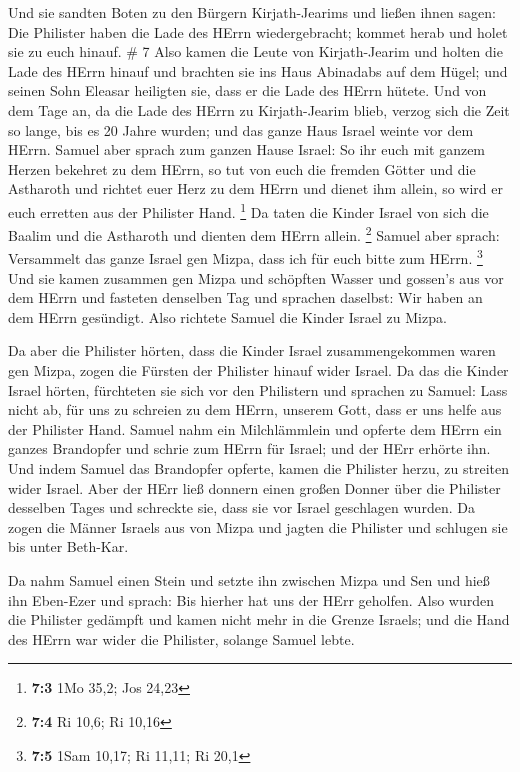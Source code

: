  Und sie sandten Boten zu den Bürgern Kirjath-Jearims und
ließen ihnen sagen: Die Philister haben die Lade des HErrn
wiedergebracht; kommet herab und holet sie zu euch hinauf. \# 7
 Also kamen die Leute von Kirjath-Jearim und holten die Lade
des HErrn hinauf und brachten sie ins Haus Abinadabs auf dem Hügel; und
seinen Sohn Eleasar heiligten sie, dass er die Lade des HErrn hütete.
 Und von dem Tage an, da die Lade des HErrn zu
Kirjath-Jearim blieb, verzog sich die Zeit so lange, bis es 20 Jahre
wurden; und das ganze Haus Israel weinte vor dem HErrn. 
Samuel aber sprach zum ganzen Hause Israel: So ihr euch mit ganzem
Herzen bekehret zu dem HErrn, so tut von euch die fremden Götter und die
Astharoth und richtet euer Herz zu dem HErrn und dienet ihm allein, so
wird er euch erretten aus der Philister Hand. \footnote{\textbf{7:3} 1Mo
  35,2; Jos 24,23}  Da taten die Kinder Israel von sich die
Baalim und die Astharoth und dienten dem HErrn allein. \footnote{\textbf{7:4}
  Ri 10,6; Ri 10,16}  Samuel aber sprach: Versammelt das
ganze Israel gen Mizpa, dass ich für euch bitte zum HErrn. \footnote{\textbf{7:5}
  1Sam 10,17; Ri 11,11; Ri 20,1}  Und sie kamen zusammen gen
Mizpa und schöpften Wasser und gossen's aus vor dem HErrn und fasteten
denselben Tag und sprachen daselbst: Wir haben an dem HErrn gesündigt.
Also richtete Samuel die Kinder Israel zu Mizpa.

 Da aber die Philister hörten, dass die Kinder Israel
zusammengekommen waren gen Mizpa, zogen die Fürsten der Philister hinauf
wider Israel. Da das die Kinder Israel hörten, fürchteten sie sich vor
den Philistern  und sprachen zu Samuel: Lass nicht ab, für
uns zu schreien zu dem HErrn, unserem Gott, dass er uns helfe aus der
Philister Hand.  Samuel nahm ein Milchlämmlein und opferte
dem HErrn ein ganzes Brandopfer und schrie zum HErrn für Israel; und der
HErr erhörte ihn.  Und indem Samuel das Brandopfer opferte,
kamen die Philister herzu, zu streiten wider Israel. Aber der HErr ließ
donnern einen großen Donner über die Philister desselben Tages und
schreckte sie, dass sie vor Israel geschlagen wurden.  Da
zogen die Männer Israels aus von Mizpa und jagten die Philister und
schlugen sie bis unter Beth-Kar.

 Da nahm Samuel einen Stein und setzte ihn zwischen Mizpa
und Sen und hieß ihn Eben-Ezer und sprach: Bis hierher hat uns der HErr
geholfen.  Also wurden die Philister gedämpft und kamen
nicht mehr in die Grenze Israels; und die Hand des HErrn war wider die
Philister, solange Samuel lebte.


